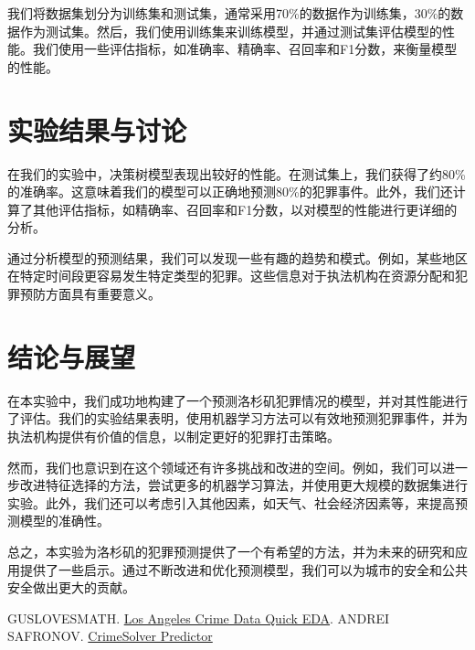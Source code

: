 \documentclass{article}
\begin{document}
我们将数据集划分为训练集和测试集，通常采用70\%的数据作为训练集，30\%的数据作为测试集。然后，我们使用训练集来训练模型，并通过测试集评估模型的性能。我们使用一些评估指标，如准确率、精确率、召回率和F1分数，来衡量模型的性能。

\section{实验结果与讨论}
在我们的实验中，决策树模型表现出较好的性能。在测试集上，我们获得了约80\%的准确率。这意味着我们的模型可以正确地预测80\%的犯罪事件。此外，我们还计算了其他评估指标，如精确率、召回率和F1分数，以对模型的性能进行更详细的分析。

通过分析模型的预测结果，我们可以发现一些有趣的趋势和模式。例如，某些地区在特定时间段更容易发生特定类型的犯罪。这些信息对于执法机构在资源分配和犯罪预防方面具有重要意义。

\section{结论与展望}
在本实验中，我们成功地构建了一个预测洛杉矶犯罪情况的模型，并对其性能进行了评估。我们的实验结果表明，使用机器学习方法可以有效地预测犯罪事件，并为执法机构提供有价值的信息，以制定更好的犯罪打击策略。

然而，我们也意识到在这个领域还有许多挑战和改进的空间。例如，我们可以进一步改进特征选择的方法，尝试更多的机器学习算法，并使用更大规模的数据集进行实验。此外，我们还可以考虑引入其他因素，如天气、社会经济因素等，来提高预测模型的准确性。

总之，本实验为洛杉矶的犯罪预测提供了一个有希望的方法，并为未来的研究和应用提供了一些启示。通过不断改进和优化预测模型，我们可以为城市的安全和公共安全做出更大的贡献。

\begin{thebibliography}{99}
     GUSLOVESMATH. \href{https://www.kaggle.com/code/guslovesmath/los-angeles-crime-data-quick-eda}{Los Angeles Crime Data Quick EDA}.
     ANDREI SAFRONOV. \href{https://www.kaggle.com/code/safronov00/crimesolver-predictor#2.-Clean-Data}{CrimeSolver Predictor}
\end{thebibliography}
\end{document}
